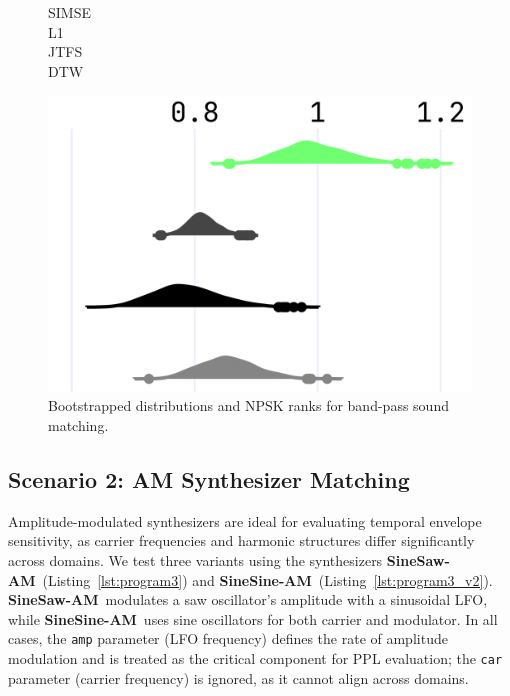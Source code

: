 \documentclass[runningheads]{llncs}
\newcommand{\FMMod}{\textbf{SineSaw-AM}\xspace}
\newcommand{\FMModvtwo}{\textbf{SineSine-AM}\xspace}
\begin{document}
\begin{figure}[htbp]
  \centering
  \scriptsize
  \begin{minipage}{\columnwidth}
    \begin{minipage}{0.10\columnwidth}
      \raggedleft
      \vspace{0.5cm}
      SIMSE\\[0.6cm]
      L1\\[0.65cm]
      JTFS\\[0.65cm]
      DTW
    \end{minipage}%
    \begin{minipage}{0.88\columnwidth}
      \centering
      \includegraphics[width=\linewidth]{images/npsk_ood_P_Loss_3.png}
    \end{minipage}
  \end{minipage}
  \caption{Bootstrapped distributions and NPSK ranks for band-pass sound matching.}
  \label{fig:npsk_BP}
\end{figure}

\subsection{Scenario 2: AM Synthesizer Matching}
Amplitude-modulated synthesizers are ideal for evaluating temporal envelope sensitivity, as carrier frequencies and harmonic structures differ significantly across domains.  
We test three variants using the synthesizers \FMMod\ (Listing~\ref{lst:program3}) and \FMModvtwo\ (Listing~\ref{lst:program3_v2}).  
\FMMod\ modulates a saw oscillator’s amplitude with a sinusoidal LFO, while \FMModvtwo\ uses sine oscillators for both carrier and modulator.  
In all cases, the \texttt{amp} parameter (LFO frequency) defines the rate of amplitude modulation and is treated as the critical component for PPL evaluation; the \texttt{car} parameter (carrier frequency) is ignored, as it cannot align across domains.
\end{document}
